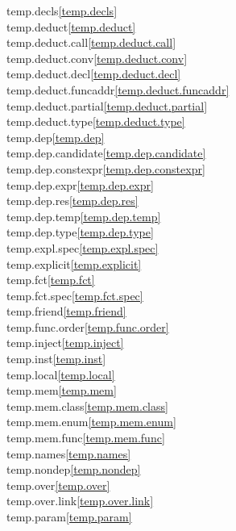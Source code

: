 \begin{multicols}{2}
temp.decls\quad\ref{temp.decls}\\
temp.deduct\quad\ref{temp.deduct}\\
temp.deduct.call\quad\ref{temp.deduct.call}\\
temp.deduct.conv\quad\ref{temp.deduct.conv}\\
temp.deduct.decl\quad\ref{temp.deduct.decl}\\
temp.deduct.funcaddr\quad\ref{temp.deduct.funcaddr}\\
temp.deduct.partial\quad\ref{temp.deduct.partial}\\
temp.deduct.type\quad\ref{temp.deduct.type}\\
temp.dep\quad\ref{temp.dep}\\
temp.dep.candidate\quad\ref{temp.dep.candidate}\\
temp.dep.constexpr\quad\ref{temp.dep.constexpr}\\
temp.dep.expr\quad\ref{temp.dep.expr}\\
temp.dep.res\quad\ref{temp.dep.res}\\
temp.dep.temp\quad\ref{temp.dep.temp}\\
temp.dep.type\quad\ref{temp.dep.type}\\
temp.expl.spec\quad\ref{temp.expl.spec}\\
temp.explicit\quad\ref{temp.explicit}\\
temp.fct\quad\ref{temp.fct}\\
temp.fct.spec\quad\ref{temp.fct.spec}\\
temp.friend\quad\ref{temp.friend}\\
temp.func.order\quad\ref{temp.func.order}\\
temp.inject\quad\ref{temp.inject}\\
temp.inst\quad\ref{temp.inst}\\
temp.local\quad\ref{temp.local}\\
temp.mem\quad\ref{temp.mem}\\
temp.mem.class\quad\ref{temp.mem.class}\\
temp.mem.enum\quad\ref{temp.mem.enum}\\
temp.mem.func\quad\ref{temp.mem.func}\\
temp.names\quad\ref{temp.names}\\
temp.nondep\quad\ref{temp.nondep}\\
temp.over\quad\ref{temp.over}\\
temp.over.link\quad\ref{temp.over.link}\\
temp.param\quad\ref{temp.param}\\

\end{multicols}
